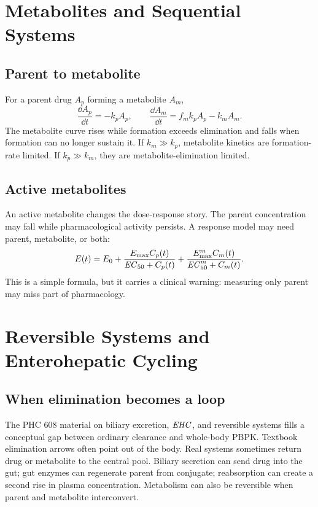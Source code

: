 \documentclass[a4paper]{article}
\newcommand{\pkECfifty}{\pksym{EC}_{50}}
\newcommand{\pkEHC}{\pksym{EHC}}
\begin{document}
\section{Metabolites and Sequential Systems}

\subsection{Parent to metabolite}

For a parent drug \(A_p\) forming a metabolite \(A_m\),
\[
  \frac{\dd A_p}{\dd t}=-k_pA_p,
  \qquad
  \frac{\dd A_m}{\dd t}=f_mk_pA_p-k_mA_m.
\]
The metabolite curve rises while formation exceeds elimination and falls when formation can no longer sustain it. If \(k_m\gg k_p\), metabolite kinetics are formation-rate limited. If \(k_p\gg k_m\), they are metabolite-elimination limited.

\subsection{Active metabolites}

An active metabolite changes the dose-response story. The parent concentration may fall while pharmacological activity persists. A response model may need parent, metabolite, or both:
\[
  E(t)=E_0+
  \frac{\Emax C_p(t)}{\pkECfifty+C_p(t)}
  +
  \frac{\Emax^m C_m(t)}{\pkECfifty^m+C_m(t)}.
\]
This is a simple formula, but it carries a clinical warning: measuring only parent may miss part of pharmacology.

\section{Reversible Systems and Enterohepatic Cycling}

\subsection{When elimination becomes a loop}

The PHC 608 material on biliary excretion, \(\pkEHC\), and reversible systems fills a conceptual gap between ordinary clearance and whole-body PBPK. Textbook elimination arrows often point out of the body. Real systems sometimes return drug or metabolite to the central pool. Biliary secretion can send drug into the gut; gut enzymes can regenerate parent from conjugate; reabsorption can create a second rise in plasma concentration. Metabolism can also be reversible when parent and metabolite interconvert.
\end{document}
